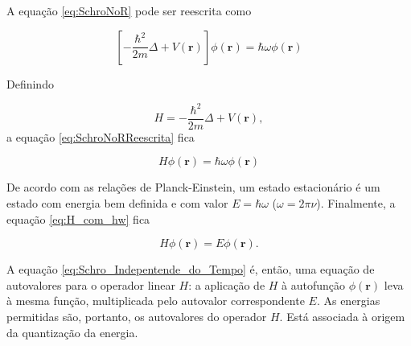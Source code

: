 	A equação \ref{eq:SchroNoR} pode ser reescrita como
	
	\begin{equation}\label{eq:SchroNoRReescrita}
			\left[-\frac{\hbar^2}{2m}\Delta + V(\textbf{r})\right] \phi(\textbf{r}) = \hbar \omega \phi(\textbf{r})
	\end{equation}
	
	Definindo 
	
	\begin{equation}
	H  = -\frac{\hbar^2}{2m}\Delta + V(\textbf{r}),
	\end{equation}
	a equação \ref{eq:SchroNoRReescrita} fica
	
	\begin{equation}\label{eq:H_com_hw}
		H\phi(\textbf{r}) = \hbar \omega \phi(\textbf{r})
	\end{equation}
	
	De acordo com as relações de Planck-Einstein, um estado estacionário é um estado com energia bem definida e com valor $E = \hbar \omega$ ($\omega = 2 \pi \nu$). Finalmente, a equação \ref{eq:H_com_hw} fica
	
	\begin{equation}\label{eq:Schro_Indepentende_do_Tempo}
		H\phi(\textbf{r}) = E \phi(\textbf{r}).
	\end{equation}
	
	A equação \ref{eq:Schro_Indepentende_do_Tempo} é, então, uma equação de autovalores para o operador linear $H$: a aplicação de $H$ à autofunção $\phi(\textbf{r})$ leva à mesma função, multiplicada pelo autovalor correspondente $E$. As energias permitidas são, portanto, os autovalores do operador $H$. Está associada à origem da quantização da energia.
	
	